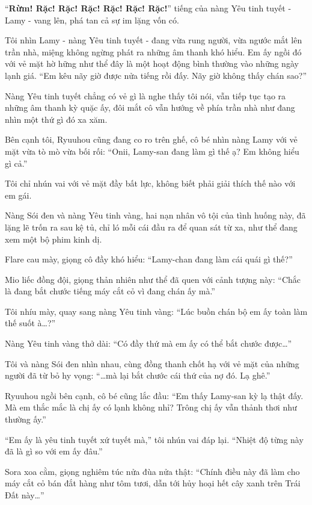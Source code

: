 \documentclass[../main.tex]{subfiles}
\begin{document}
``\textbf{Rừm! Rặc! Rặc! Rặc! Rặc! Rặc! Rặc!}'' tiếng của nàng Yêu tinh tuyết - Lamy - vang lên, phá tan cả sự im lặng vốn có.


Tôi nhìn Lamy - nàng Yêu tinh tuyết - đang vừa rung người, vừa ngước mắt lên trần nhà, miệng không ngừng phát ra những âm thanh khó hiểu. Em ấy ngồi đó với vẻ mặt hờ hững như thể đây là một hoạt động bình thường vào những ngày lạnh giá. ``Em kêu nãy giờ được nửa tiếng rồi đấy. Nãy giờ không thấy chán sao?''

Nàng Yêu tinh tuyết chẳng có vẻ gì là nghe thấy tôi nói, vẫn tiếp tục tạo ra những âm thanh kỳ quặc ấy, đôi mắt cô vẫn hướng về phía trần nhà như đang nhìn một thứ gì đó xa xăm.

Bên cạnh tôi, Ryuuhou cũng đang co ro trên ghế, cô bé nhìn nàng Lamy với vẻ mặt vừa tò mò vừa bối rối: ``Onii, Lamy-san đang làm gì thế ạ? Em không hiểu gì cả.''

Tôi chỉ nhún vai với vẻ mặt đầy bất lực, không biết phải giải thích thế nào với em gái.

Nàng Sói đen và nàng Yêu tinh vàng, hai nạn nhân vô tội của tình huống này, đã lặng lẽ trốn ra sau kệ tủ, chỉ ló mỗi cái đầu ra để quan sát từ xa, như thể đang xem một bộ phim kinh dị.


Flare cau mày, giọng cô đầy khó hiểu: ``Lamy-chan đang làm cái quái gì thế?''

Mio liếc đồng đội, giọng thản nhiên như thể đã quen với cảnh tượng này: ``Chắc là đang bắt chước tiếng máy cắt cỏ vì đang chán ấy mà.''

Tôi nhíu mày, quay sang nàng Yêu tinh vàng: ``Lúc buồn chán bộ em ấy toàn làm thế suốt à\dots?''

Nàng Yêu tinh vàng thở dài: ``Có đầy thứ mà em ấy có thể bắt chước được\dots''

Tôi và nàng Sói đen nhìn nhau, cùng đồng thanh chốt hạ với vẻ mặt của những người đã từ bỏ hy vọng: ``\dots mà lại bắt chước cái thứ của nợ đó. Lạ ghê.''

Ryuuhou ngồi bên cạnh, cô bé cũng lắc đầu: ``Em thấy Lamy-san kỳ lạ thật đấy. Mà em thắc mắc là chị ấy có lạnh không nhỉ? Trông chị ấy vẫn thảnh thơi như thường ấy.''

``Em ấy là yêu tinh tuyết xứ tuyết mà,'' tôi nhún vai đáp lại. ``Nhiệt độ từng này đã là gì so với em ấy đâu.''

Sora xoa cằm, giọng nghiêm túc nửa đùa nửa thật: ``Chính điều này đã làm cho máy cắt cỏ bán đắt hàng như tôm tươi, dẫn tới hủy hoại hết cây xanh trên Trái Đất này\dots''
\end{document}
